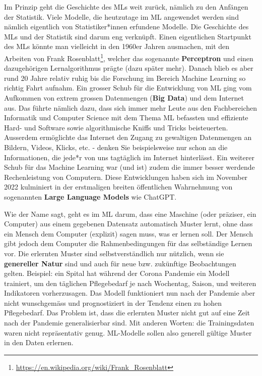 \documentclass[
]{book}
\begin{document}
Im Prinzip geht die Geschichte des MLs weit zurück, nämlich zu den Anfängen der Statistik. Viele Modelle, die heutzutage im ML angewendet werden sind nämlich eigentlich von Statistiker*innen erfundene Modelle. Die Geschichte des MLs und der Statistik sind darum eng verknüpft. Einen eigentlichen Startpunkt des MLs könnte man vielleicht in den 1960er Jahren ausmachen, mit den Arbeiten von Frank Rosenblatt\footnote{\url{https://en.wikipedia.org/wiki/Frank_Rosenblatt}}, welcher das sogenannte \textbf{Perceptron} und einen dazugehörigen Lernalgorithmus prägte (dazu später mehr). Danach blieb es aber rund 20 Jahre relativ ruhig bis die Forschung im Bereich Machine Learning so richtig Fahrt aufnahm. Ein grosser Schub für die Entwicklung von ML ging vom Aufkommen von extrem grossen Datenmengen (\textbf{Big Data}) und dem Internet aus. Das führte nämlich dazu, dass sich immer mehr Leute aus den Fachbereichen Informatik und Computer Science mit dem Thema ML befassten und effiziente Hard- und Software sowie algorithmische Kniffs und Tricks beisteuerten. Ausserdem ermöglichte das Internet den Zugang zu gewaltigen Datenmengen an Bildern, Videos, Klicks, etc. - denken Sie beispielsweise nur schon an die Informationen, die jede*r von uns tagtäglich im Internet hinterlässt. Ein weiterer Schub für das Machine Learning war (und ist) zudem die immer besser werdende Rechenleistung von Computern. Diese Entwicklungen haben sich im November 2022 kulminiert in der erstmaligen breiten öffentlichen Wahrnehmung von sogenannten \textbf{Large Language Models} wie ChatGPT.

Wie der Name sagt, geht es im ML darum, dass eine Maschine (oder präziser, ein Computer) aus einem gegebenen Datensatz automatisch Muster lernt, ohne dass ein Mensch dem Computer (explizit) sagen muss, was er lernen soll. Der Mensch gibt jedoch dem Computer die Rahmenbedingungen für das selbständige Lernen vor. Die erlernten Muster sind selbstverständlich nur nützlich, wenn sie \textbf{genereller Natur} sind und auch für neue bzw. zukünftige Beobachtungen gelten. Beispiel: ein Spital hat während der Corona Pandemie ein Modell trainiert, um den täglichen Pflegebedarf je nach Wochentag, Saison, und weiteren Indikatoren vorherzusagen. Das Modell funktioniert nun nach der Pandemie aber nicht wunschgemäss und prognostiziert in der Tendenz einen zu hohen Pflegebedarf. Das Problem ist, dass die erlernten Muster nicht gut auf eine Zeit nach der Pandemie generalisierbar sind. Mit anderen Worten: die Trainingsdaten waren nicht repräsentativ genug. ML-Modelle sollen also generell gültige Muster in den Daten erlernen.
\end{document}
